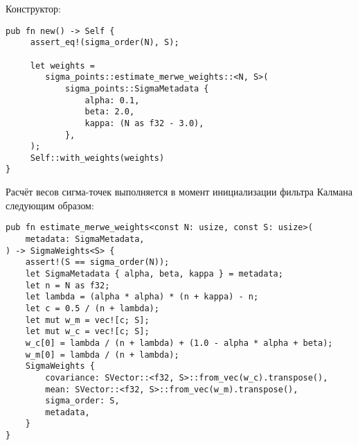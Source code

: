 Конструктор:
\begin{lstlisting}
pub fn new() -> Self {
     assert_eq!(sigma_order(N), S);

     let weights =
        sigma_points::estimate_merwe_weights::<N, S>(
            sigma_points::SigmaMetadata {
                alpha: 0.1,
                beta: 2.0,
                kappa: (N as f32 - 3.0),
            },
     );
     Self::with_weights(weights)
}

\end{lstlisting}

Расчёт весов сигма-точек выполняется в момент инициализации фильтра Калмана
следующим образом:
\begin{lstlisting}
pub fn estimate_merwe_weights<const N: usize, const S: usize>(
    metadata: SigmaMetadata,
) -> SigmaWeights<S> {
    assert!(S == sigma_order(N));
    let SigmaMetadata { alpha, beta, kappa } = metadata;
    let n = N as f32;
    let lambda = (alpha * alpha) * (n + kappa) - n;
    let c = 0.5 / (n + lambda);
    let mut w_m = vec![c; S];
    let mut w_c = vec![c; S];
    w_c[0] = lambda / (n + lambda) + (1.0 - alpha * alpha + beta);
    w_m[0] = lambda / (n + lambda);
    SigmaWeights {
        covariance: SVector::<f32, S>::from_vec(w_c).transpose(),
        mean: SVector::<f32, S>::from_vec(w_m).transpose(),
        sigma_order: S,
        metadata,
    }
}

\end{lstlisting}

